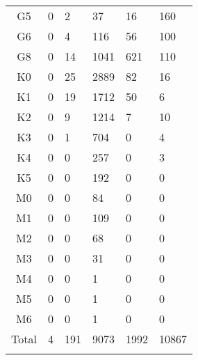 \begin{table}[t]
\begin{tabular}{c|lllll}
    G5 & 0 & 2 & 37 & 16 & 160 \\
    G6 & 0 & 4 & 116 & 56 & 100 \\
    G8 & 0 & 14 & 1041 & 621 & 110 \\
    K0 & 0 & 25 & 2889 & 82 & 16 \\
    K1 & 0 & 19 & 1712 & 50 & 6 \\
    K2 & 0 & 9 & 1214 & 7 & 10 \\
    K3 & 0 & 1 & 704 & 0 & 4 \\
    K4 & 0 & 0 & 257 & 0 & 3 \\
    K5 & 0 & 0 & 192 & 0 & 0 \\
    M0 & 0 & 0 & 84 & 0 & 0 \\
    M1 & 0 & 0 & 109 & 0 & 0 \\
    M2 & 0 & 0 & 68 & 0 & 0 \\
    M3 & 0 & 0 & 31 & 0 & 0 \\
    M4 & 0 & 0 & 1 & 0 & 0 \\
    M5 & 0 & 0 & 1 & 0 & 0 \\
    M6 & 0 & 0 & 1 & 0 & 0 \\
    Total & 4 & 191 & 9073 & 1992 & 10867 \\
    \bottomrule
    \addlinespace[10pt]
    \end{tabular}
    \label{table:bin_counts}
\end{table}
